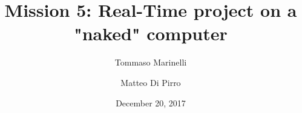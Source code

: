 \documentclass[a4paper,10pt]{article}
\begin{document}
\title{Mission 5: Real-Time project on a "naked" computer}
\author{Tommaso Marinelli \and Matteo Di Pirro}
\date{December 20, 2017}

\maketitle





\end{document}
